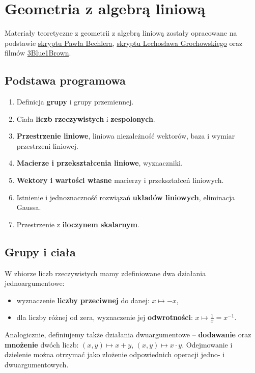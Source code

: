 \chapter{Geometria z algebrą liniową}

Materiały teoretyczne z geometrii z algebrą liniową zostały opracowane na podstawie \href{https://www.mimuw.edu.pl/~pbechler/inf_gal/}{skryptu Pawła Bechlera}, \href{https://www.ap.uj.edu.pl/diplomas/149716/?_s=1}{skryptu Lechosława Grochowskiego} oraz filmów \href{https://www.youtube.com/c/3blue1brown/}{3Blue1Brown}.

\section*{Podstawa programowa}
\begin{enumerate}
    \item Definicja \textbf{grupy} i grupy przemiennej.
    \item Ciała \textbf{liczb rzeczywistych} i \textbf{zespolonych}.
    \item \textbf{Przestrzenie liniowe}, liniowa niezależność wektorów, baza i wymiar przestrzeni liniowej.
    \item \textbf{Macierze i przekształcenia liniowe}, wyznaczniki.
    \item \textbf{Wektory i wartości własne} macierzy i przekształceń liniowych.
    \item Istnienie i jednoznaczność rozwiązań \textbf{układów liniowych}, eliminacja Gaussa.
    \item Przestrzenie z \textbf{iloczynem skalarnym}.
\end{enumerate}

\section{Grupy i ciała}

W zbiorze liczb rzeczywistych mamy zdefiniowane dwa działania jednoargumentowe:
\begin{itemize}
    \item wyznaczenie \textbf{liczby przeciwnej} do danej: $x\mapsto-x$,
    \item dla liczby różnej od zera, wyznaczenie jej \textbf{odwrotności}: $x\mapsto\frac{1}{x}=x^{-1}$.
\end{itemize}

Analogicznie, definiujemy także działania dwuargumentowe -- \textbf{dodawanie} oraz \textbf{mnożenie} dwóch liczb: $(x,y)\mapsto x+y$, $(x,y)\mapsto x\cdot y$. Odejmowanie i dzielenie można otrzymać jako złożenie odpowiednich operacji jedno- i dwuargumentowych.

